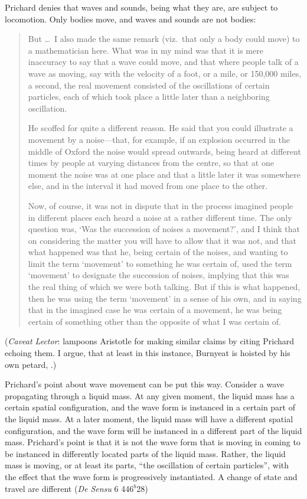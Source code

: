 Prichard denies that waves and sounds, being what they are, are subject to locomotion. Only bodies move, and waves and sounds are not bodies:
\begin{quotation}
	But \dots\ I also made the same remark (viz.\ that only a body could move) to a mathematician here. What was in my mind was that it is mere inaccuracy to say that a wave could move, and that where people talk of a wave as moving, say with the velocity of a foot, or a mile, or 150,000 miles, a second, the real movement consisted of the oscillations of certain particles, each of which took place a little later than a neighboring oscillation.
	
	He scoffed for quite a different reason. He said that you could illustrate a movement by a noise---that, for example, if an explosion occurred in the middle of Oxford the noise would spread outwards, being heard at different times by people at varying distances from the centre, so that at one moment the noise was at one place and that a little later it was somewhere else, and in the interval it had moved from one place to the other.
	
	Now, of course, it was not in dispute that in the process imagined people in different places each heard a noise at a rather different time. The only question was, `Was the succession of noises a movement?', and I think that on considering the matter you will have to allow that it was not, and that what happened was that he, being certain of the noises, and wanting to limit the term `movement' to something he was certain of, used the term `movement' to designate the succession of noises, implying that this was the real thing of which we were both talking. But if this is what happened, then he was using the term `movement' in a sense of his own, and in saying that in the imagined case he was certain of a movement, he was being certain of something other than the opposite of what I was certain of. \citep[99]{Prichard:1950kx}
\end{quotation}
(\emph{Caveat Lector}: \citealt[430 n. 29; appendix,]{Burnyeat:1995fk} lampoons Aristotle for making similar claims by citing Prichard echoing them. I argue, that at least in this instance, Burnyeat is hoisted by his own petard, \citealt[chapter 3.2]{Kalderon:2015fr}.)

Prichard's point about wave movement can be put this way. Consider a wave propagating through a liquid mass. At any given moment, the liquid mass has a certain spatial configuration, and the wave form is instanced in a certain part of the liquid mass. At a later moment, the liquid mass will have a different spatial configuration, and the wave form will be instanced in a different part of the liquid mass. Prichard's point is that it is not the wave form that is moving in coming to be instanced in differently located parts of the liquid mass. Rather, the liquid mass is moving, or at least its parts, ``the oscillation of certain particles'', with the effect that the wave form is progressively instantiated. A change of state and travel are different (\emph{De Sensu} 6 446\( ^{b} \)28)

